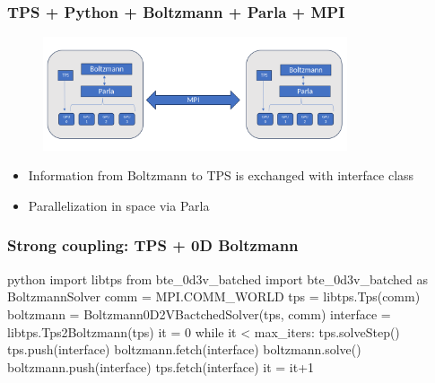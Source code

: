 \documentclass[mathserif, aspectratio=169]{beamer}
\newcommand{\vect}[1]{\boldsymbol{#1}}
\begin{document}
\begin{frame}
	\frametitle{TPS + Python + Boltzmann + Parla + MPI}
	\begin{figure}
		\centering
		\includegraphics[width=0.8\textwidth]{software_integration.png}
	\end{figure}
	\begin{itemize}
		\item Information from Boltzmann to TPS is exchanged with interface class
		\item Parallelization in space via Parla
	\end{itemize}
\end{frame}

\begin{frame}[fragile]
\frametitle{Strong coupling: TPS + 0D Boltzmann}
\begin{mintedbox}{python}%
import libtps
from   bte_0d3v_batched import bte_0d3v_batched as BoltzmannSolver
comm = MPI.COMM_WORLD
tps = libtps.Tps(comm)
boltzmann = Boltzmann0D2VBactchedSolver(tps, comm)
interface = libtps.Tps2Boltzmann(tps)
it = 0
while it < max_iters:
    tps.solveStep()
    tps.push(interface)
    boltzmann.fetch(interface)
    boltzmann.solve()
    boltzmann.push(interface)
    tps.fetch(interface)
    it = it+1
\end{mintedbox}
\end{frame}

\end{document}
